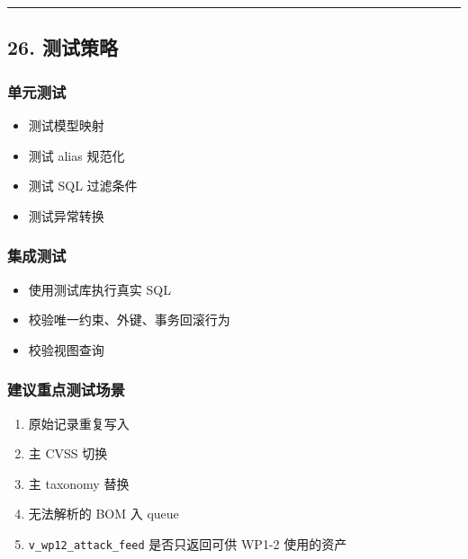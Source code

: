 \documentclass[UTF8]{ctexart}
\providecommand{\tightlist}{%
  \setlength{\itemsep}{0pt}\setlength{\parskip}{0pt}}
\begin{document}
\begin{center}\rule{0.5\linewidth}{0.5pt}\end{center}

\hypertarget{ux6d4bux8bd5ux7b56ux7565}{%
\subsection{26. 测试策略}\label{ux6d4bux8bd5ux7b56ux7565}}

\hypertarget{ux5355ux5143ux6d4bux8bd5}{%
\subsubsection{单元测试}\label{ux5355ux5143ux6d4bux8bd5}}

\begin{itemize}
\tightlist
\item
  测试模型映射
\item
  测试 alias 规范化
\item
  测试 SQL 过滤条件
\item
  测试异常转换
\end{itemize}

\hypertarget{ux96c6ux6210ux6d4bux8bd5}{%
\subsubsection{集成测试}\label{ux96c6ux6210ux6d4bux8bd5}}

\begin{itemize}
\tightlist
\item
  使用测试库执行真实 SQL
\item
  校验唯一约束、外键、事务回滚行为
\item
  校验视图查询
\end{itemize}

\hypertarget{ux5efaux8baeux91cdux70b9ux6d4bux8bd5ux573aux666f}{%
\subsubsection{建议重点测试场景}\label{ux5efaux8baeux91cdux70b9ux6d4bux8bd5ux573aux666f}}

\begin{enumerate}
\def\labelenumi{\arabic{enumi}.}
\tightlist
\item
  原始记录重复写入
\item
  主 CVSS 切换
\item
  主 taxonomy 替换
\item
  无法解析的 BOM 入 queue
\item
  \texttt{v\_wp12\_attack\_feed} 是否只返回可供 WP1-2 使用的资产
\end{enumerate}
\end{document}
